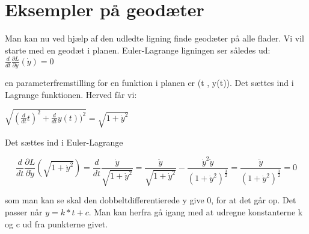 \section{Eksempler på geodæter}
Man kan nu ved hjælp af den udledte ligning finde geodæter på alle flader. Vi vil starte med en geodæt i planen. Euler-Lagrange ligningen ser således ud:
$\frac{d}{dt} \frac{\partial L}{\partial \dot{y}}(\dot{y})=0$

en parameterfremstilling for en funktion i planen er (t , y(t)). Det sættes ind i Lagrange funktionen. Herved får vi:

$\sqrt{(\frac{d}{dt}t)^2+\frac{d}{dt}y(t))^2}=\sqrt{1+\dot{y}^2}$

Det sættes ind i Euler-Lagrange
 
\begin{equation}
\frac{d}{dt} \frac{\partial L}{\partial \dot{y}}(\sqrt{1+\dot{y}^2})=\frac{d}{dt} \frac{\dot{y}}{\sqrt{1+\dot{y}^2}} = \frac{\ddot{y}}{\sqrt{1+\dot{y}^2}}-\frac{\dot{y}^2\ddot{y}}{(1+\dot{y}^2)^\frac{3}{2}}=\frac{\ddot{y}}{(1+\dot{y}^2)^\frac{3}{2}}=0
\end{equation}

som man kan se skal den dobbeltdifferentierede y give 0, for at det går op. Det passer når $y=k*t+c$. Man kan herfra gå igang med at udregne konstanterne k og c ud fra punkterne givet.